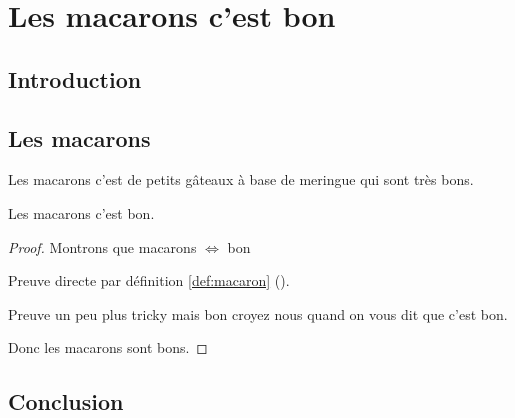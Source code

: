 
\chapter{Les macarons c'est bon}
\label{chap:macarons}



\section{Introduction}

\section{Les macarons}
\begin{definition}[Macaron]
  Les macarons c'est de petits gâteaux à base de meringue qui sont très bons.
  \label{def:macaron}
\end{definition}

\begin{proposition}
  Les macarons c'est bon.
\end{proposition}

\begin{proof}
  Montrons que macarons $\Leftrightarrow$ bon

  \begin{myproof}
    Preuve directe par définition \ref{def:macaron} ().
  \end{myproof}
  \begin{myproof}
    Preuve un peu plus tricky mais bon croyez nous quand on vous dit que c'est bon.
  \end{myproof}
  Donc les macarons sont bons.
\end{proof}

\section{Conclusion}
